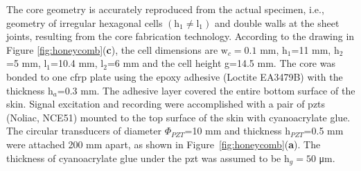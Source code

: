 The core geometry is accurately reproduced from the actual specimen, i.e., geometry of irregular hexagonal cells \(\left(\mathrm{h}_1 \ne \mathrm{l}_1\right)\) and double walls at the sheet joints, resulting from the core fabrication technology.
According to the drawing in Figure \ref{fig:honeycomb}(\textbf{c}), the cell dimensions are \(\mathrm{w}_c=0.1\) \unit{\mm}, h\(_1\)=11 \unit{\mm}, h\(_2\)=5 \unit{\mm}, l\(_1\)=10.4 \unit{\mm}, l\(_2\)=6 \unit{\mm} and the cell height g=14.5 \unit{\mm}.
The core was bonded to one \ac{cfrp} plate using the epoxy adhesive (Loctite EA3479B) with the thickness h\(_a\)=0.3 \unit{\mm}.
The adhesive layer covered the entire bottom surface of the skin.
%
%
%
%
%
%
%
%
Signal excitation and recording were accomplished with a pair of \acp{pzt}  (Noliac, NCE51) mounted to the top surface of the skin with cyanoacrylate glue.
The circular transducers of diameter \(\Phi_{PZT}\)=10 \unit{\mm} and thickness h\(_{PZT}\)=0.5 \unit{\mm} were attached 200 \unit{\mm} apart, as shown in Figure~\ref{fig:honeycomb}(\textbf{a}).
The thickness of cyanoacrylate glue under the \ac{pzt} was assumed to be h\(_g=50\) \unit{\micro\m}.

